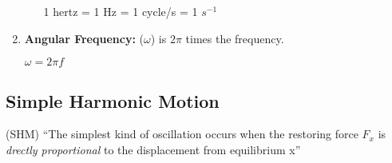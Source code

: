 \documentclass[10pt]{article}
\begin{document}
\begin{enumerate}
\begin{itemize}
			\begin{mybox}
				\begin{center}
					1 hertz = 1 Hz = 1 cycle/s = 1 $s^{-1}$
				\end{center}
			\end{mybox}
		\end{itemize}
		\item \textbf{Angular Frequency: } ($\omega$) is $2 \pi$ times the frequency. \\
		\begin{mybox}
			\begin{center}
				$\omega = 2 \pi f$
			\end{center}
		\end{mybox}
		\bigbreak
	\end{enumerate}

\bigbreak
\subsection{Simple Harmonic Motion} (SHM)
``The simplest kind of oscillation occurs when the restoring force $F_{x}$ is \textit{drectly proportional} to the displacement from equilibrium x'' \\
\end{document}
